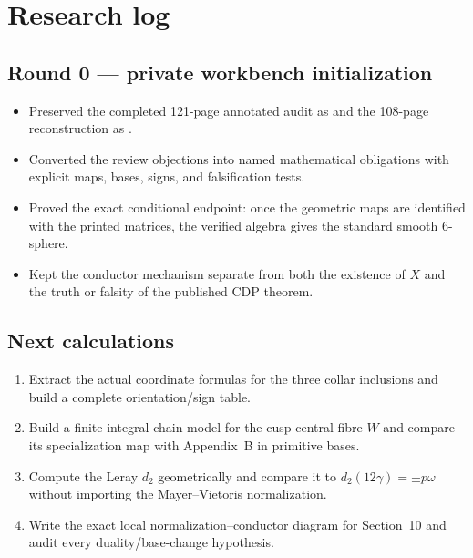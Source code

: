 \section{Research log}

\subsection*{Round 0 --- private workbench initialization}

\begin{itemize}[leftmargin=1.8em]
\item Preserved the completed 121-page annotated audit as  and the 108-page reconstruction as .
\item Converted the review objections into named mathematical obligations with explicit maps, bases, signs, and falsification tests.
\item Proved the exact conditional endpoint: once the geometric maps are identified with the printed matrices, the verified algebra gives the standard smooth $6$-sphere.
\item Kept the conductor mechanism separate from both the existence of $X$ and the truth or falsity of the published CDP theorem.
\end{itemize}

\subsection*{Next calculations}

\begin{enumerate}[leftmargin=1.8em]
\item Extract the actual coordinate formulas for the three collar inclusions and build a complete orientation/sign table.
\item Build a finite integral chain model for the cusp central fibre $W$ and compare its specialization map with Appendix~B in primitive bases.
\item Compute the Leray $d_2$ geometrically and compare it to $d_2(12\gamma)=\pm p\omega$ without importing the Mayer--Vietoris normalization.
\item Write the exact local normalization--conductor diagram for Section~10 and audit every duality/base-change hypothesis.
\end{enumerate}

